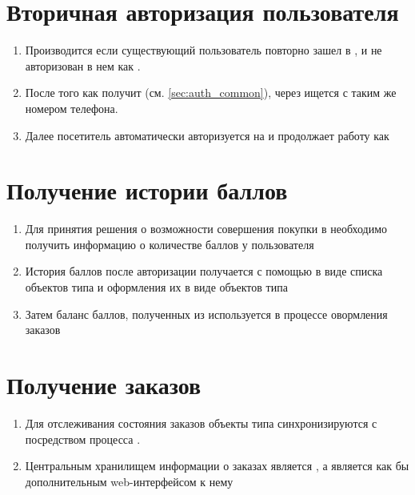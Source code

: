     
    \section{Вторичная авторизация пользователя}
    \label{sec:auth_second}
        \begin{enumerate}
            \item Производится если существующий пользователь  повторно зашел в , и не авторизован в нем как .
            \item После того как  получит  (см. \ref{sec:auth_common}), 
                через  ищется  с таким же номером телефона.
            \item Далее посетитель автоматически авторизуется на  и продолжает работу как 
        \end{enumerate}
    
    
    \section{Получение истории баллов}
    \label{sec:get_points_history}
    \begin{enumerate}
        \item Для принятия решения о возможности совершения покупки в  
            необходимо получить информацию о количестве баллов у пользователя 
        \item История баллов после авторизации получается с помощью  в виде списка объектов типа
             и оформления их в виде объектов типа 
        \item Затем баланс баллов, полученных из  используется в процессе овормления заказов 
    \end{enumerate}

    
    \section{Получение заказов}
    \begin{enumerate}
        \item Для отслеживания состояния заказов объекты типа  синхронизируются с  посредством 
            процесса .
        \item Центральным хранилищем информации о заказах является , а  является как бы дополнительным web-интерфейсом к нему
    \end{enumerate}

    
    
    
    

